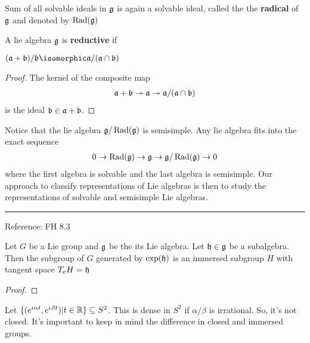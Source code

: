 \begin{definition}[Radical]
    Sum of all solvable ideals in $\mathfrak{g}$ is again a solvable ideal, called the the \textbf{radical} of $\mathfrak{g}$ and denoted by $\operatorname{Rad}(\mathfrak{g})$
\end{definition}

\begin{definition}[Reductive]
    A lie algebra $\mathfrak{g}$ is \textbf{reductive} if
\end{definition}

\begin{lemma}
    $ (\mathfrak{a} + \mathfrak{b})/\mathfrak{b} \isomorphic \mathfrak a / (\mathfrak a \cap \mathfrak b) $
\end{lemma}
\begin{proof} The kernel of the composite map 
   \begin{align}
       \mathfrak{a} + \mathfrak{b} \twoheadrightarrow \mathfrak{a} \twoheadrightarrow \mathfrak{a}/(\mathfrak{a} \cap \mathfrak{b})
   \end{align} 
   is the ideal $\mathfrak{b} \in \mathfrak{a} + \mathfrak{b}$.
\end{proof}


Notice that the lie algebra $\mathfrak{g}/\operatorname{Rad}(\mathfrak{g})$ is semisimple. Any lie algebra fits into the exact sequence
\begin{align}
    0\to \operatorname{Rad}(\mathfrak{g}) \to \mathfrak{g} \to \mathfrak{g}/\operatorname{Rad}(\mathfrak{g}) \to 0
\end{align}
where the first algebra is solvable and the last algebra is semisimple. Our approach to classify representations of Lie  algebras is then to study the representations of solvable and semisimple Lie algebras.

\begin{theorem}
    
\end{theorem}

\vspace{1em}
\hrule
\vspace{1em}

Reference: FH 8.3
\begin{proposition}
    Let $G$ be a Lie group and $\mathfrak{g}$ be the its Lie algebra. Let $\mathfrak{h}\in \mathfrak{g}$ be a subalgebra. 
    Then the subgroup of $G$ generated by $\exp(\mathfrak{h})$ is an immersed subgroup $H$ with tangent space $T_eH=\mathfrak{h}$
\end{proposition}
\begin{proof}
\end{proof}


\begin{insight}
    Let $\{(e^{\iota \alpha t}, e^{\iota\beta t})| t\in \mathbb{R}\} \subseteq S^2 $. This is dense in $S^2$ if $\alpha/\beta$ is irrational. So, it's not closed. It's important to keep in mind the difference in closed and immersed groups. 
\end{insight}



